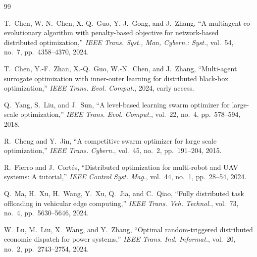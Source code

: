 \documentclass[11pt,a4paper]{ctexart}
\begin{document}
\begin{thebibliography}{99}

T.~Chen, W.-N.~Chen, X.-Q.~Guo, Y.-J.~Gong, and J.~Zhang,
``A multiagent co-evolutionary algorithm with penalty-based objective for network-based distributed optimization,''
\emph{IEEE Trans. Syst., Man, Cybern.: Syst.}, vol.~54, no.~7, pp.~4358--4370, 2024.

T.~Chen, Y.-F.~Zhan, X.-Q.~Guo, W.-N.~Chen, and J.~Zhang,
``Multi-agent surrogate optimization with inner-outer learning for distributed black-box optimization,''
\emph{IEEE Trans. Evol. Comput.}, 2024, early access.

Q.~Yang, S.~Liu, and J.~Sun,
``A level-based learning swarm optimizer for large-scale optimization,''
\emph{IEEE Trans. Evol. Comput.}, vol.~22, no.~4, pp.~578--594, 2018.

R.~Cheng and Y.~Jin,
``A competitive swarm optimizer for large scale optimization,''
\emph{IEEE Trans. Cybern.}, vol.~45, no.~2, pp.~191--204, 2015.

R.~Fierro and J.~Cort\'es,
``Distributed optimization for multi-robot and UAV systems: A tutorial,''
\emph{IEEE Control Syst. Mag.}, vol.~44, no.~1, pp.~28--54, 2024.

Q.~Ma, H.~Xu, H.~Wang, Y.~Xu, Q.~Jia, and C.~Qiao,
``Fully distributed task offloading in vehicular edge computing,''
\emph{IEEE Trans. Veh. Technol.}, vol.~73, no.~4, pp.~5630--5646, 2024.

W.~Lu, M.~Liu, X.~Wang, and Y.~Zhang,
``Optimal random-triggered distributed economic dispatch for power systems,''
\emph{IEEE Trans. Ind. Informat.}, vol.~20, no.~2, pp.~2743--2754, 2024.

\end{thebibliography}
\end{document}
